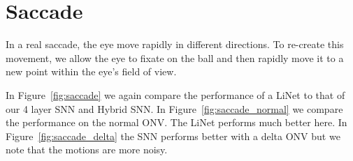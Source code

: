 \documentclass [MS] {UCLAthesis}
\begin{document}

\section{Saccade}

In a real saccade, the eye move rapidly in different directions. To re-create this movement, we allow the eye to fixate on the ball and then rapidly move it to a new point within the eye's field of view. 

In Figure~\ref{fig:saccade} we again compare the performance of a LiNet to that of our 4 layer SNN and Hybrid SNN.
In Figure~\ref{fig:saccade_normal} we compare the performance on the normal ONV. The LiNet performs much better here. In Figure~\ref{fig:saccade_delta} the SNN performs better with a delta ONV but we note that the motions are more noisy. 
\end{document}
